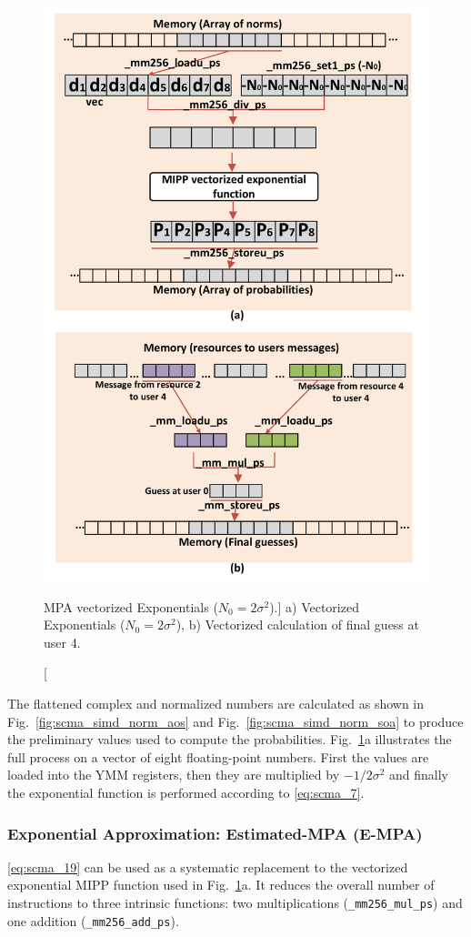 \begin{figure}[htp]
  \centering
  \includegraphics[width=0.70\linewidth]{scma/simd_exp_mul/simd_exp_mul}
  \caption
    [MPA vectorized Exponentials ($N_0 = 2\sigma^2$).]
    {a) Vectorized Exponentials ($N_0 = 2\sigma^2$),
     b) Vectorized calculation of final guess at user 4.}
  \label{fig:scma_simd_exp_mul}
\end{figure}

The flattened complex and normalized numbers are calculated as shown in
Fig.~\ref{fig:scma_simd_norm_aos} and Fig.~\ref{fig:scma_simd_norm_soa} to
produce the preliminary values used to compute the probabilities.
Fig.~\ref{fig:scma_simd_exp_mul}a illustrates the full process on a vector of
eight floating-point numbers. First the values are loaded into the YMM
registers, then they are multiplied by $-1/2\sigma^2$ and finally the
exponential function is performed according to \eqref{eq:scma_7}.

\subsubsection{Exponential Approximation: Estimated-MPA (E-MPA)}

\eqref{eq:scma_19} can be used as a systematic replacement to the vectorized
exponential MIPP function used in Fig.~\ref{fig:scma_simd_exp_mul}a. It reduces
the overall number of instructions to three intrinsic functions: two
multiplications (\verb|_mm256_mul_ps|) and one addition (\verb|_mm256_add_ps|).

